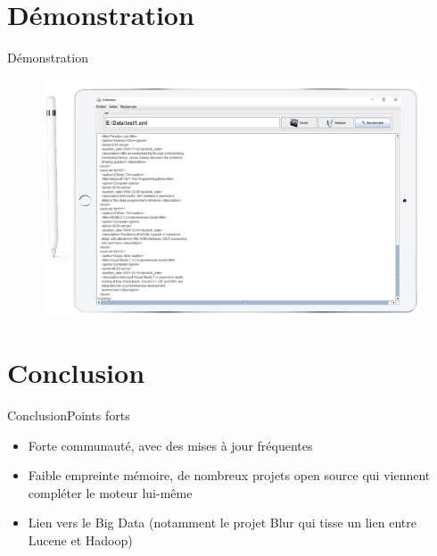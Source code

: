 \documentclass[10pt]{beamer}
\begin{document}
\section{Démonstration}
\begin{frame}{Démonstration}

\begin{figure}[t]
    \centering
    \includegraphics[height=\dimexpr10\textheight/16\relax]{image}
  \end{figure}
\end{frame}
\section{Conclusion}

\begin{frame}{Conclusion}{Points forts}

\begin{itemize}

\item Forte communauté, avec des mises à jour fréquentes 
\item Faible empreinte mémoire, de nombreux projets open source qui viennent compléter le moteur lui-même
\item Lien vers le Big Data (notamment le projet Blur qui tisse un lien entre Lucene et Hadoop)

\end{itemize}

\end{frame}

\end{document}
